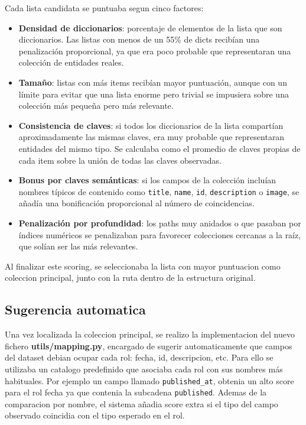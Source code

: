 Cada lista candidata se puntuaba segun cinco factores:

\begin{itemize}
    \item \textbf{Densidad de diccionarios}: porcentaje de elementos de la lista que son diccionarios. Las listas con menos de un 55\% de dicts recibían una penalización proporcional, ya que era poco probable que representaran una colección de entidades reales.
    \item \textbf{Tamaño}: listas con más items recibían mayor puntuación, aunque con un límite para evitar que una lista enorme pero trivial se impusiera sobre una colección más pequeña pero más relevante.
    \item \textbf{Consistencia de claves}: si todos los diccionarios de la lista compartían aproximadamente las mismas claves, era muy probable que representaran entidades del mismo tipo. Se calculaba como el promedio de claves propias de cada item sobre la unión de todas las claves observadas.
    \item \textbf{Bonus por claves semánticas}: si los campos de la colección incluían nombres típicos de contenido como \texttt{title}, \texttt{name}, \texttt{id},    \texttt{description} o \texttt{image}, se añadía una bonificación proporcional al número de coincidencias.
    \item \textbf{Penalización por profundidad}: los paths muy anidados o que pasaban por índices numéricos se penalizaban para favorecer colecciones cercanas a la raíz, que solían ser las más relevantes.
\end{itemize}

Al finalizar este scoring, se seleccionaba la lista con mayor puntuacion como coleccion principal, junto con la ruta dentro de la estructura original.

\subsection{Sugerencia automatica}
\label{subsec:sugerencia-automatica}

Una vez localizada la coleccion principal, se realizo la implementacion del nuevo fichero \textbf{utils/mapping.py}, encargado de sugerir automaticamente que campos
del dataset debian ocupar cada rol: fecha, id, descripcion, etc. Para ello se utilizaba un catalogo predefinido que asociaba cada rol con sus nombres más habituales.
Por ejemplo un campo llamado \texttt{published\_at}, obtenia un alto score para el rol fecha ya que contenia la subcadena \texttt{published}.
Ademas de la comparacion por nombre, el sistema añadia score extra si el tipo del campo observado coincidia con el tipo esperado en el rol.

